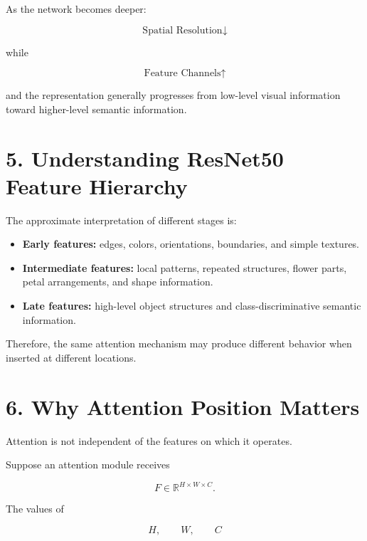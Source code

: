 \documentclass[10pt]{article}
\begin{document}
As the network becomes deeper:

\[
\boxed{
\text{Spatial Resolution}\downarrow
}
\]

while

\[
\boxed{
\text{Feature Channels}\uparrow
}
\]

and the representation generally progresses from low-level visual
information toward higher-level semantic information.

\section*{5. Understanding ResNet50 Feature Hierarchy}

The approximate interpretation of different stages is:

\begin{itemize}

\item \textbf{Early features:}
edges, colors, orientations, boundaries, and simple textures.

\item \textbf{Intermediate features:}
local patterns, repeated structures, flower parts, petal arrangements, and
shape information.

\item \textbf{Late features:}
high-level object structures and class-discriminative semantic information.

\end{itemize}

Therefore, the same attention mechanism may produce different behavior when
inserted at different locations.

\section*{6. Why Attention Position Matters}

Attention is not independent of the features on which it operates.

Suppose an attention module receives

\[
F\in\mathbb{R}^{H\times W\times C}.
\]

The values of

\[
H,\qquad W,\qquad C
\]
\end{document}
